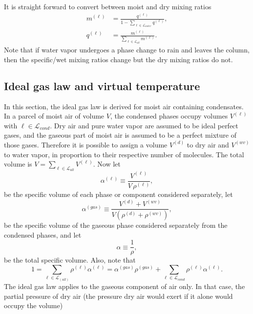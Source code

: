 \documentclass{agujournal}
\begin{document}
{It is straight forward to convert between moist and dry mixing ratios
\begin{align}
m^{(\ell)}&=\frac{q^{(\ell)}}{1-\sum_{\ell \in \mathcal{L}_{water}} q^{(\ell)}},\label{eq:mxqx}\\
q^{(\ell)}&=\frac{m^{(\ell)}}{\sum_{\ell \in \mathcal{L}_{all}} m^{(\ell)}}.
\end{align}
Note that if water vapor undergoes a phase change to rain and leaves the column, then the specific/wet mixing ratios change but the dry mixing ratios do not.


%
\subsection{Ideal gas law and virtual temperature}\label{sec:tv}
In this section, the ideal gas law is derived for moist air containing condensates. In a parcel of moist air
of volume $V$, the condensed phases occupy volumes $V^{(\ell)}$ with $\ell \in \mathcal{L}_{cond}$. Dry air and pure water vapor are
assumed to be ideal perfect gases, and the gaseous part of moist air is assumed to be a perfect mixture of
those gases. Therefore it is possible to assign a volume $V^{(d)}$ to dry air and $V^{(wv)}$ to water vapor, in proportion
to their respective number of molecules. The total volume is $V=\sum_{\ell \in \mathcal{L}_{all}}V^{(\ell)}$. Now let 
\begin{equation}
\alpha^{(\ell)}\equiv \frac{V^{(\ell)}}{V\, \rho^{(\ell)}},
\end{equation}
be the specific volume of each phase or component considered separately, let
\begin{equation}
\alpha^{(gas)}\equiv \frac{ V^{(d)} + V^{(wv)}}{V \left( \rho^{(d)} + \rho^{(wv)}\right)},
\end{equation}
be the specific volume of the gaseous phase considered separately from the condensed phases, and let
\begin{equation}
\alpha\equiv \frac{1}{\rho},\label{eq:rhoalpha}
\end{equation}
be the total specific volume. Also, note that
\begin{equation}
\label{eq:sum1}
1 = \sum_{\ell \in \mathcal{L}_{(all)}} \rho^{(\ell)}\alpha^{(\ell)} = \alpha^{(gas)}\rho^{(gas)} + \sum_{\ell \in \mathcal{L}_{cond}}\rho^{(\ell)}\alpha^{(\ell)}.
\end{equation}
The ideal gas law applies to the gaseous component of air only. In that case, the partial pressure of dry air (the pressure dry air would exert if it alone would occupy the volume)
}
\end{document}
